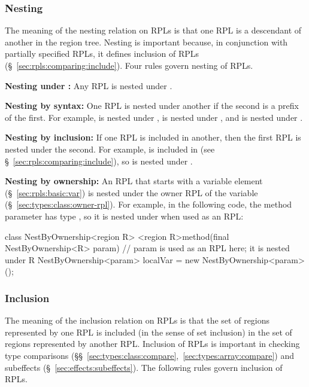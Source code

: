 \subsubsection{Nesting%
\label{sec:rpls:comparing:nest}}

The meaning of the nesting relation on RPLs is that one RPL is a
descendant of another in the region tree.  Nesting is important
because, in conjunction with partially specified RPLs, it defines
inclusion of RPLs (\S~\ref{sec:rpls:comparing:include}).  Four rules
govern nesting of RPLs.

\noindent
\textbf{Nesting under :}  Any RPL is nested under
.

\noindent
\textbf{Nesting by syntax:} One RPL is nested under another if the
second is a prefix of the first.  For example,  is nested
under ,  is nested under , and 
is nested under .

\noindent
\textbf{Nesting by inclusion:} If one RPL is included in another, then
the first RPL is nested under the second.  For example,  is
included in  (see \S~\ref{sec:rpls:comparing:include}), so
 is nested under .

\noindent
\textbf{Nesting by ownership:} An RPL that starts with a variable
element (\S~\ref{sec:rpls:basic:var}) is nested under the owner RPL of
the variable (\S~\ref{sec:types:class:owner-rpl}).  For example, in
the following code, the method parameter  has type
, so it is nested under  when used as
an RPL:
%
\begin{dpjlisting}
class NestByOwnership<region R> {
    <region R>method(final NestByOwnership<R> param) {
        // param is used as an RPL here; it is nested under R
        NestByOwnership<param> localVar = new NestByOwnership<param>();
    }
}
\end{dpjlisting}

\subsubsection{Inclusion%
\label{sec:rpls:comparing:include}}

The meaning of the inclusion relation on RPLs is that the set of
regions represented by one RPL is included (in the sense of set
inclusion) in the set of regions represented by another RPL.
Inclusion of RPLs is important in checking type comparisons
(\S\S~\ref{sec:types:class:compare},~\ref{sec:types:array:compare})
and subeffects (\S~\ref{sec:effects:subeffects}).  The following rules
govern inclusion of RPLs.

